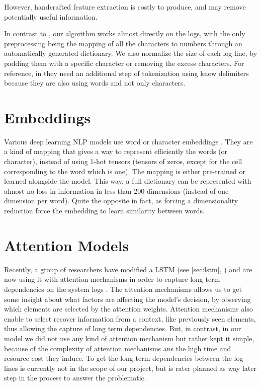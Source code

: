 However, handcrafted feature extraction is costly to produce, and may remove potentially useful information.

In contrast to \cite{lstm_cluster}, our algorithm works almost directly on the logs, with the only preprocessing being the mapping of all the characters to numbers through an automatically generated dictionary.
We also normalize the size of each log line, by padding them with a specific character or removing the excess characters.
For reference, in \cite{rnn_attention_lanl} they need an additional step of tokenization using know delimiters because they are also using words and not only characters.

\section{Embeddings}
Various deep learning NLP models use word or character embeddings \cite{pooling_simple,deep_learning_book}. They are a kind of mapping that gives a way to represent efficiently the words (or character), instead of using 1-hot tensors (tensors of zeros, except for the cell corresponding to the word which is one). The mapping is either pre-trained or learned alongside the model. This way, a full dictionary can be represented with almost no loss in information in less than 200 dimensions (instead of one dimension per word). Quite the opposite in fact, as forcing a dimensionality reduction force the embedding to learn similarity between words.

\section{Attention Models}
Recently, a group of researchers have modified a LSTM (see \autoref{sec:lstm}, ) and are now using it with attention mechanisms in order to capture long term dependencies on the system logs \cite{rnn_attention_lanl}.
The attention mechanisms allows us to get some insight about what factors are affecting the model’s decision, by observing which elements are selected by the attention weights. Attention mechanisms also enable to select recover information from a context, like previously seen elements, thus allowing the capture of long term dependencies.
But, in contrast, in our model we did not use any kind of attention mechanism but rather kept it simple, because of the complexity of attention mechanisms ans the high time and resource cost they induce. To get the long term dependencies between the log lines is currently not in the scope of our project, but is rater planned as way later step in the process to answer the problematic.

